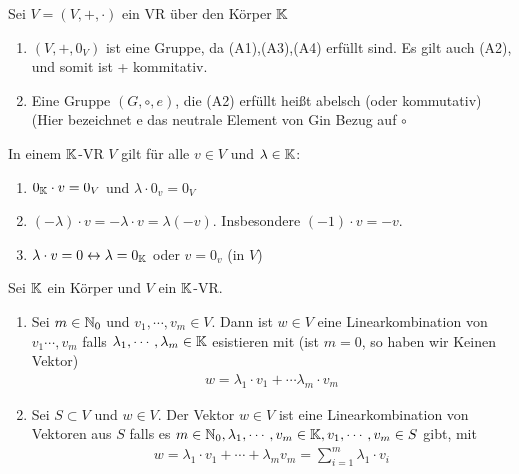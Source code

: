 \begin{remark}
    Sei $V=(V,+,\cdot)$ ein VR über den Körper $\mathbb{K}$
    \begin{enumerate}
        \item $(V,+,0_V)$ ist eine Gruppe, da (A1),(A3),(A4) erfüllt sind. Es gilt auch (A2), und somit ist + kommitativ.
        \item Eine Gruppe $(G,\circ,e)$, die (A2) erfüllt heißt abelsch (oder kommutativ) (Hier bezeichnet e das neutrale Element von Gin Bezug auf $\circ$
    \end{enumerate}
\end{remark}
\newpage
\begin{lemma}
 In einem $\mathbb{K}$-VR $V$ gilt für alle $v\in V$ und $\lambda \in \mathbb{K}$:
 \begin{enumerate}
    \item $0_{\mathbb{K}} \cdot v = 0_V$ und $\lambda \cdot 0_v = 0_V$
    \item $(-\lambda)\cdot v = -\lambda \cdot v=\lambda(-v)$. Insbesondere $(-1)\cdot v = -v$.
    \item $\lambda \cdot v = 0 \leftrightarrow \lambda = 0_{\mathbb{K}}$ oder $v=0_v$ (in $V$)
 \end{enumerate}
\end{lemma}

\begin{definition}
    Sei $\mathbb{K}$ ein Körper und $V$ ein $\mathbb{K}$-VR.
    \begin{enumerate}
        \item Sei $m\in\mathbb{N}_0$ und $v_1,\dotsb,v_m \in V$. Dann ist $w\in V $ eine Linearkombination von $v_1\dotsb,v_m$ falls $\lambda_1,\dotsb,\lambda_m\in \mathbb{K}$ esistieren mit (ist $m=0$, so haben wir Keinen Vektor)
        \begin{align*}
            w=\lambda_1 \cdot v_1+\dotsb \lambda_m\cdot v_m
        \end{align*}
        \item Sei $S\subset V$ und $w\in V$. Der Vektor $w\in V$ ist eine Linearkombination von Vektoren aus $S$ falls es $m \in \mathbb{N}_0, \lambda_1,\dotsb,v_m\in\mathbb{K},v_1,\dotsb,v_m\in S$ gibt, mit
        \begin{align*}
            w=\lambda_1 \cdot v_1 + \dotsb + \lambda_m v_m = \sum_{i=1}^{m}\lambda_1\cdot v_i
        \end{align*}
    \end{enumerate}
\end{definition}


